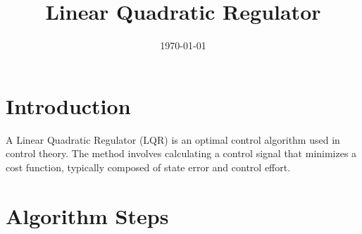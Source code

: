 \documentclass{article}
\begin{document}
    \title{Linear Quadratic Regulator}
    \date{\today}

    \maketitle

    \section{Introduction}

    A Linear Quadratic Regulator (LQR) is an optimal control algorithm used in control theory. The method involves calculating a control signal that minimizes a cost function, typically composed of state error and control effort.

    \section{Algorithm Steps}
\end{document}
